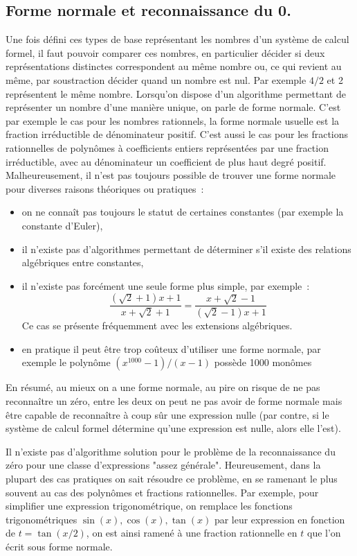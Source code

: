 \documentclass[a4paper,11pt]{article}
\begin{document}
\begin{giacjshere}
\subsection{Forme normale et reconnaissance du 0.}
Une fois défini ces types de base représentant les nombres d'un système de 
calcul formel, il faut pouvoir comparer ces 
nombres, en particulier décider si deux représentations distinctes 
correspondent au m\^eme nombre ou, ce qui revient au 
m\^eme, par soustraction décider quand un nombre est nul. 
Par exemple $4/2$ et 2 représentent le m\^eme nombre. 
Lorsqu'on dispose d'un algorithme permettant de représenter un nombre 
d'une manière unique, on parle de forme normale. 
C'est par exemple le cas pour les nombres rationnels, la forme normale 
usuelle est la fraction irréductible de 
dénominateur positif. C'est aussi le cas pour les fractions rationnelles 
de polynômes à coefficients entiers représentées par une fraction 
irréductible, avec au dénominateur un coefficient de plus haut degré
positif.
Malheureusement, il n'est pas toujours possible de trouver une forme normale
pour diverses raisons théoriques ou pratiques~: 
\begin{itemize}
\item on ne connaît pas toujours le statut de certaines constantes
(par exemple la constante d'Euler),
\item il n'existe pas d'algorithmes permettant de déterminer
s'il existe des relations algébriques entre constantes,
\item il n'existe pas forcément une seule forme plus simple, par exemple~:
\[ \frac{(\sqrt{2}+1)x+1}{x+\sqrt{2}+1}=\frac{x+\sqrt{2}-1}{(\sqrt{2}-1)x+1} \]
Ce cas se présente fréquemment avec les extensions algébriques.
\item en pratique il peut être trop coûteux d'utiliser une forme
normale, par exemple le polynôme $(x^{1000}-1)/(x-1)$ possède 1000 monômes
\end{itemize}
En résumé, au mieux on a une forme normale, au pire on risque de ne pas 
reconnaître un zéro, entre les deux on peut ne
pas avoir de forme normale mais être capable de reconnaître à coup sûr 
une expression nulle (par contre, si le système 
de calcul formel détermine qu'une expression est nulle, alors elle l'est).

Il n'existe pas d'algorithme solution
pour le problème de la reconnaissance du zéro pour une classe 
d'expressions "assez générale". Heureusement, 
dans la plupart des cas pratiques on sait résoudre ce problème, en
se ramenant le plus souvent au cas des polynômes et fractions rationnelles.
Par exemple, pour simplifier une expression trigonométrique,
on remplace les fonctions trigonométriques $\sin(x), \cos(x), \tan(x)$
par leur expression en fonction de $t=\tan(x/2)$, on est ainsi ramené
à une fraction rationnelle en $t$ que l'on écrit sous forme normale.


\end{giacjshere}
\end{document}
